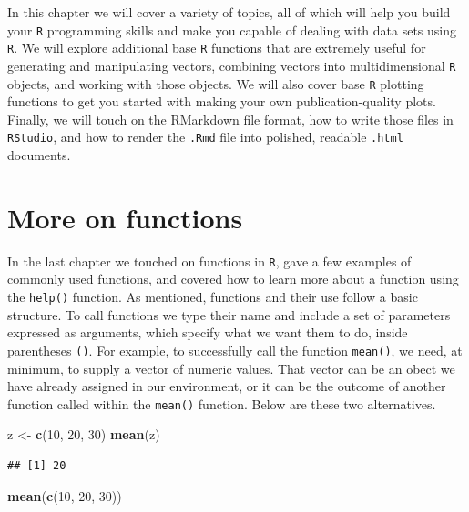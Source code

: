 \documentclass[]{book}
\newenvironment{Shaded}{\begin{snugshade}}{\end{snugshade}}
\newcommand{\DecValTok}[1]{\textcolor[rgb]{0.00,0.00,0.81}{#1}}
\newcommand{\KeywordTok}[1]{\textcolor[rgb]{0.13,0.29,0.53}{\textbf{#1}}}
\newcommand{\NormalTok}[1]{#1}
\newcommand{\StringTok}[1]{\textcolor[rgb]{0.31,0.60,0.02}{#1}}
\begin{document}
In this chapter we will cover a variety of topics, all of which will help you build your \texttt{R} programming skills and make you capable of dealing with data sets using \texttt{R}. We will explore additional base \texttt{R} functions that are extremely useful for generating and manipulating vectors, combining vectors into multidimensional \texttt{R} objects, and working with those objects. We will also cover base \texttt{R} plotting functions to get you started with making your own publication-quality plots. Finally, we will touch on the RMarkdown file format, how to write those files in \texttt{RStudio}, and how to render the \texttt{.Rmd} file into polished, readable \texttt{.html} documents.

\hypertarget{more-on-functions}{%
\section{More on functions}\label{more-on-functions}}

In the last chapter we touched on functions in \texttt{R}, gave a few examples of commonly used functions, and covered how to learn more about a function using the \texttt{help()} function. As mentioned, functions and their use follow a basic structure. To call functions we type their name and include a set of parameters expressed as arguments, which specify what we want them to do, inside parentheses \texttt{()}. For example, to successfully call the function \texttt{mean()}, we need, at minimum, to supply a vector of numeric values. That vector can be an obect we have already assigned in our environment, or it can be the outcome of another function called within the \texttt{mean()} function. Below are these two alternatives.

\begin{Shaded}
\begin{Highlighting}[]
\NormalTok{z <-}\StringTok{ }\KeywordTok{c}\NormalTok{(}\DecValTok{10}\NormalTok{, }\DecValTok{20}\NormalTok{, }\DecValTok{30}\NormalTok{)}
\KeywordTok{mean}\NormalTok{(z)}
\end{Highlighting}
\end{Shaded}

\begin{verbatim}
## [1] 20
\end{verbatim}

\begin{Shaded}
\begin{Highlighting}[]
\KeywordTok{mean}\NormalTok{(}\KeywordTok{c}\NormalTok{(}\DecValTok{10}\NormalTok{, }\DecValTok{20}\NormalTok{, }\DecValTok{30}\NormalTok{))}
\end{Highlighting}
\end{Shaded}
\end{document}
